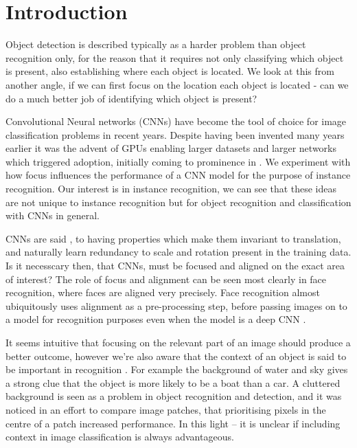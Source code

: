 \documentclass[conference]{IEEEtran}
\begin{document}
\IEEEpeerreviewmaketitle
 

\section{Introduction}

Object detection is described typically as a harder problem than object recognition only, for the reason that it requires not only classifying which object is present, also establishing where each object is located. We look at this from another angle, if we can first focus on the location each object is located - can we do a much better job of identifying which object is present? 

Convolutional Neural networks (CNNs) \cite{LeCun1998} have become the tool of choice for image classification problems in recent years. Despite having been invented many years earlier it was the advent of GPUs enabling larger datasets and larger networks which triggered adoption, initially coming to prominence in \cite {Krizhevsky2012}.  We experiment with how focus influences the performance of a CNN model for the purpose of instance recognition. Our interest is in instance recognition, we can see that these ideas are not unique to instance recognition but for object recognition and classification with CNNs in general.

CNNs are said \cite{Krizhevsky2012}, to having properties which make them invariant to translation, and naturally learn redundancy to scale and rotation present in the training data. Is it necesscary then, that CNNs, must be focused and aligned on the exact area of interest? The role of focus and alignment can be seen most clearly in face recognition, where faces are aligned very precisely. Face recognition almost ubiquitously uses alignment as a pre-processing step, before passing images on to a model for recognition purposes even when the model is a deep CNN \cite{Taigman2014}.

It seems intuitive that focusing on the relevant part of an image should produce a better outcome, however we're also aware that the context of an object is said to be important in recognition \cite{Torralba2003}. For example the background of water and sky gives a strong clue that the object is more likely to be a boat than a car. A cluttered background is seen as a problem in object recognition and detection, and it was noticed in an effort to compare image patches, that prioritising pixels in the centre of a patch \cite{Zagoruyko2015} increased performance. In this light -- it is unclear if including context in image classification is always advantageous. 
\end{document}

